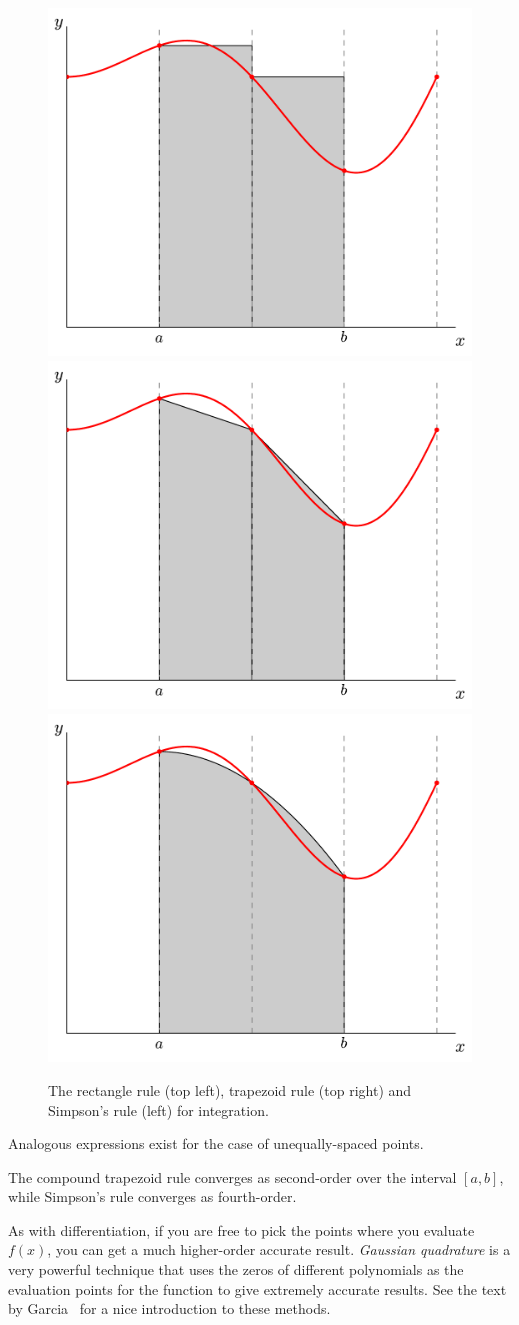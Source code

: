 \begin{figure}
\centering
\includegraphics[width=0.49\linewidth]{rectangle}
\includegraphics[width=0.49\linewidth]{trapezoid} \\
\includegraphics[width=0.49\linewidth]{simpsons}
\begin{minipage}[b]{0.49\linewidth}
\caption[Integration rules]{\label{fig:integration} The rectangle rule
  (top left), trapezoid rule (top right) and Simpson's rule (left) for
  integration.}
\end{minipage}
\end{figure}


Analogous expressions exist for the case of unequally-spaced points.

The compound trapezoid rule converges as second-order over the
interval $[a,b]$, while Simpson's rule converges as fourth-order.

As with differentiation, if you are free to pick the points where you
evaluate $f(x)$, you can get a much higher-order accurate result.
{\em Gaussian quadrature} is a very powerful technique that uses the
zeros of different polynomials as the evaluation points for the
function to give extremely accurate results.  See the text by
Garcia~\cite{garcia} for a nice introduction to these methods.


